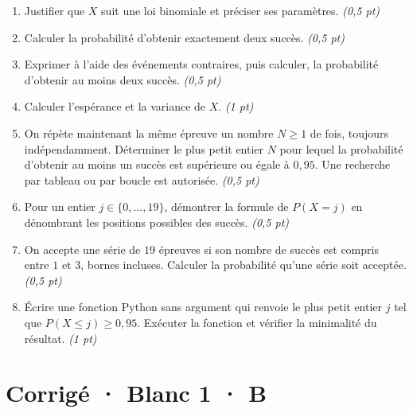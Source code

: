 \begin{enumerate}

\item Justifier que $X$ suit une loi binomiale et préciser ses paramètres. \hfill\textit{(0,5 pt)}

\item Calculer la probabilité d'obtenir exactement deux succès. \hfill\textit{(0,5 pt)}

\item Exprimer à l'aide des événements contraires, puis calculer, la probabilité d'obtenir au moins deux succès. \hfill\textit{(0,5 pt)}

\item Calculer l'espérance et la variance de $X$. \hfill\textit{(1 pt)}

\item On répète maintenant la même épreuve un nombre $N\ge1$ de fois, toujours indépendamment. Déterminer le plus petit entier $N$ pour lequel la probabilité d'obtenir au moins un succès est supérieure ou égale à $0{,}95$. Une recherche par tableau ou par boucle est autorisée. \hfill\textit{(0,5 pt)}

\item Pour un entier $j\in\{0,\ldots,19\}$, démontrer la formule de $P(X=j)$ en dénombrant les positions possibles des succès. \hfill\textit{(0,5 pt)}

\item On accepte une série de $19$ épreuves si son nombre de succès est compris entre $1$ et $3$, bornes incluses. Calculer la probabilité qu'une série soit acceptée. \hfill\textit{(0,5 pt)}

\item Écrire une fonction Python sans argument qui renvoie le plus petit entier $j$ tel que $P(X\le j)\ge0{,}95$. Exécuter la fonction et vérifier la minimalité du résultat. \hfill\textit{(1 pt)}

\end{enumerate}

\ifprof\clearpage

\section*{Corrigé · Blanc 1 · B}\label{cor:5-4}


